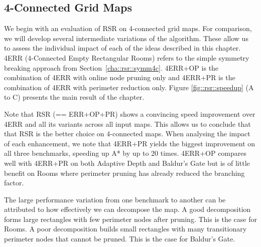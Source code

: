 

\subsection{4-Connected Grid Maps}
We begin with an evaluation of RSR on 4-connected grid maps. 
For comparison, we will develop several intermediate variations
of the algorithm. These allow us to assess the individual impact
of each of the ideas described in this chapter.
4ERR (4-Connected Empty Rectangular Rooms) refers to the simple
symmetry breaking approach from Section~\ref{cha::rsr::symm4c}.
4ERR+OP is the combination of 4ERR with online node pruning only and 
4ERR+PR is the combination of 4ERR with perimeter reduction only.
Figure \ref{fig::rsr::speedup} (A to C) presents the main result of the
chapter.
\par
Note that RSR (== ERR+OP+PR) shows a convincing 
speed improvement over 4ERR and all its variants across all input maps.
This allows us to conclude that that RSR is the better choice on 4-connected maps.
When analysing the impact of each enhancement, we note that 4ERR+PR yields the
biggest improvement on all three benchmarks, speeding up A* by up to 20 times.
4ERR+OP compares well with 4ERR+PR on both Adaptive Depth and
Baldur's Gate but is of little benefit on Rooms where perimeter pruning has
already reduced the branching factor.
\par
The large performance variation from one benchmark to another can be attributed
to how effectively we can decompose the map. A good decomposition forms large
rectangles with few perimeter nodes after pruning. This is the case for Rooms.
A poor decomposition builds small rectangles with many transitionary perimeter 
nodes that cannot be pruned. This is the case for Baldur's Gate. 

